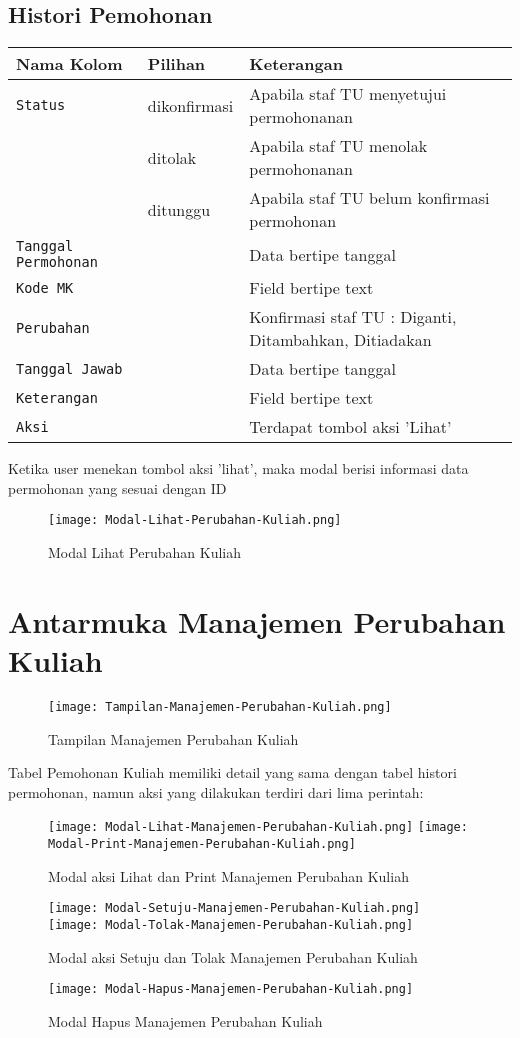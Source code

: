 \begin{enumerate}
\subsection{Histori Pemohonan}
\begin{tabular}{ |p{4cm}|p{2cm}|p{10cm}|  }
	\hline
	Nama Kolom & Pilihan & Keterangan\\
	\hline
	\texttt{Status} & dikonfirmasi & Apabila staf TU menyetujui permohonanan\\
	\hline
	&  ditolak  & Apabila staf TU menolak permohonanan\\
	\hline
	& ditunggu &  Apabila staf TU belum konfirmasi permohonan \\
	\hline
	\texttt{Tanggal Permohonan}    & & Data bertipe tanggal \\
	\hline
	\texttt{Kode MK} &  & Field bertipe text \\
	\hline
	\texttt{Perubahan} &  &  Konfirmasi staf TU : Diganti, Ditambahkan, Ditiadakan \\
	\hline
	\texttt{Tanggal Jawab} &  & Data bertipe tanggal \\
	\hline
	\texttt{Keterangan} &  & Field bertipe text \\
	\hline
	\texttt{Aksi} &  & Terdapat tombol aksi 'Lihat' \\
	\hline
\end{tabular}
Ketika user menekan tombol aksi 'lihat', maka modal berisi informasi data permohonan yang sesuai dengan ID 
\begin{figure} [H]
	\centering  
	\texttt{[image: Modal-Lihat-Perubahan-Kuliah.png]}  
	\caption{Modal Lihat Perubahan Kuliah} 
\end{figure}


\section{Antarmuka Manajemen Perubahan Kuliah}
\begin{figure} [H]
	\centering  
	\texttt{[image: Tampilan-Manajemen-Perubahan-Kuliah.png]}  
	\caption{Tampilan Manajemen Perubahan Kuliah} 
\end{figure}
Tabel Pemohonan Kuliah memiliki detail yang sama dengan tabel histori permohonan, namun aksi yang dilakukan terdiri dari lima perintah:
\begin{figure} [H]
	\centering  
	\texttt{[image: Modal-Lihat-Manajemen-Perubahan-Kuliah.png]}  
	\texttt{[image: Modal-Print-Manajemen-Perubahan-Kuliah.png]} 
	\caption{Modal aksi Lihat dan Print Manajemen Perubahan Kuliah} 
\end{figure}
\begin{figure} [H]
	\centering  
	\texttt{[image: Modal-Setuju-Manajemen-Perubahan-Kuliah.png]}
	\texttt{[image: Modal-Tolak-Manajemen-Perubahan-Kuliah.png]}    
	\caption{Modal aksi Setuju dan Tolak Manajemen Perubahan Kuliah} 
\end{figure}
\begin{figure} [H]
	\centering  
	\texttt{[image: Modal-Hapus-Manajemen-Perubahan-Kuliah.png]}  
	\caption{Modal Hapus Manajemen Perubahan Kuliah} 
\end{figure}


\end{enumerate}
